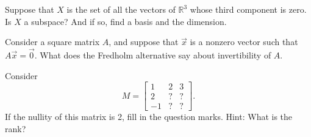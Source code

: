 \begin{exercise}
Suppose that $X$ is the set of all the vectors of ${\mathbb{R}}^3$ whose
third component is zero.  Is $X$ a subspace?  And if so, find a basis
and the dimension.
\end{exercise}

\begin{exercise}
Consider a square matrix $A$, and suppose that $\vec{x}$ is a nonzero
vector such that $A \vec{x} = \vec{0}$.  What does the Fredholm alternative
say about invertibility of $A$.
\end{exercise}

\begin{exercise}
Consider
\begin{equation*}
M =
\begin{bmatrix}
1 & 2 & 3 \\
2 & ? & ? \\
-1 & ? & ?
\end{bmatrix} .
\end{equation*}
If the nullity of this matrix is 2, fill in the question marks.  Hint: What
is the rank?
\end{exercise}

\setcounter{exercise}{100}

